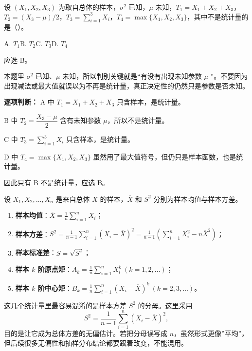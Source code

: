 ﻿\documentclass[lang=cn,11pt]{elegantbook}
\begin{document}
\begin{exercise}\label{exer:6-stat-mu}
设 \((X_1, X_2, X_3)\) 为取自总体的样本，\(\sigma^2\) 已知，\(\mu\) 未知，\(T_1=X_1+X_2+X_3\)，\(T_2=(X_3-\mu)/2\)，\(T_3=\sum_{i=1}^{3}X_i\)，\(T_4=\max\{X_1,X_2,X_3\}\)，其中不是统计量的是（\quad）。\par
A. \(T_1\)\quad B. \(T_2\)\quad C. \(T_3\)\quad D. \(T_4\)
\end{exercise}
\begin{solution}
应选 B。

本题里 \(\sigma^2\) 已知、\(\mu\) 未知，所以判别关键就是“有没有出现未知参数 \(\mu\) ”。不要因为出现减法或最大值就误以为不再是统计量，真正决定性的仍然只是参数是否未知。

\textbf{逐项判断：}
A 中 \(T_1=X_1+X_2+X_3\) 只含样本，是统计量。

B 中 \(T_2=\dfrac{X_3-\mu}{2}\) 含有未知参数 \(\mu\)，所以不是统计量。

C 中 \(T_3=\sum_{i=1}^{3}X_i\) 只含样本，是统计量。

D 中 \(T_4=\max\{X_1,X_2,X_3\}\) 虽然用了最大值符号，但仍只是样本函数，也是统计量。

因此只有 B 不是统计量，应选 B。
\end{solution}


\begin{definition}[常用统计量] \label{def:common-stat}
设 \(X_1, X_2, \dots, X_n\) 是来自总体 \(X\) 的样本，\(\overline{X}\) 和 \(S^2\) 分别为样本均值与样本方差。
\begin{enumerate}
    \item \textbf{样本均值}：\(\displaystyle\overline{X} = \frac{1}{n}\sum_{i=1}^{n}X_i\)；
    \item \textbf{样本方差}：\(\displaystyle S^2 = \frac{1}{n-1}\sum_{i=1}^{n}(X_i - \overline{X})^2 = \frac{1}{n-1}\!\left(\sum_{i=1}^{n}X_i^2 - n\overline{X}^2\right)\)；
    \item \textbf{样本标准差}：\(S = \sqrt{S^2}\)；
    \item \textbf{样本 \(k\) 阶原点矩}：\(\displaystyle A_k = \frac{1}{n}\sum_{i=1}^{n}X_i^k\ (k=1,2,\dots)\)；
    \item \textbf{样本 \(k\) 阶中心矩}：\(\displaystyle B_k = \frac{1}{n}\sum_{i=1}^{n}(X_i - \overline{X})^k\ (k=2,3,\dots)\)。
\end{enumerate}
\end{definition}

\begin{note}
这几个统计量里最容易混淆的是样本方差 \(S^2\) 的分母。这里采用
\[
S^2=\frac{1}{n-1}\sum_{i=1}^{n}(X_i-\overline{X})^2,
\]
目的是让它成为总体方差的无偏估计。若把分母误写成 \(n\)，虽然形式更像”平均”，但后续很多无偏性和抽样分布结论都要跟着改变，不能混用。
\end{note}
\end{document}
